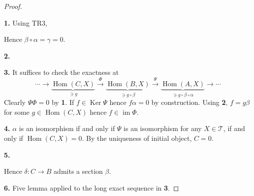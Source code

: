\documentclass[10pt]{article}
\numberwithin{equation}{section}
\DeclareMathOperator{\Hom}{Hom}
\DeclareMathOperator{\Ker}{Ker}
\DeclareMathOperator{\id}{id}
\DeclareMathOperator{\image}{im}
\newcommand{\sT}[0]{\mathscr{T}}
\begin{document}
\begin{proof}$\:$
    \par\textbf{1.} Using TR3,
    \begin{center}
    \end{center}
    Hence $\beta\circ\alpha = \gamma=0$.
    \par\textbf{2.}
    \begin{center}
    \end{center}
    \par\textbf{3.} It suffices to check the exactness at 
    \begin{equation*}
        \cdots\to\underbrace{\Hom(C,X)}_{\ni g}\stackrel{\Phi}{\to}\underbrace{\Hom(B,X)}_{\ni g\circ\beta}\stackrel{\Psi}{\to}\underbrace{\Hom(A,X)}_{\ni g\circ\beta\circ\alpha}\to\cdots
    \end{equation*}
    Clearly $\Psi\Phi = 0$ by \textbf{1}. If $f\in\Ker\Psi$ hence $f\alpha=0$ by construction. Using \textbf{2}, $f=g\beta$ for some $g\in \Hom(C,X)$ hence $f\in\image\Phi$.
    \par\textbf{4.} $\alpha$ is an isomorphism if and only if $\Psi$ is an isomorphism for any $X\in\sT$, if and only if $\Hom(C,X)=0$. By the uniqueness of initial object, $C=0$.
    \par\textbf{5.} 
    \begin{center}
    \end{center}
    Hence $\delta:C\to B$ admits a section $\beta$.
    \par\textbf{6.} Five lemma applied to the long exact sequence in \textbf{3}.
\end{proof}
\end{document}
